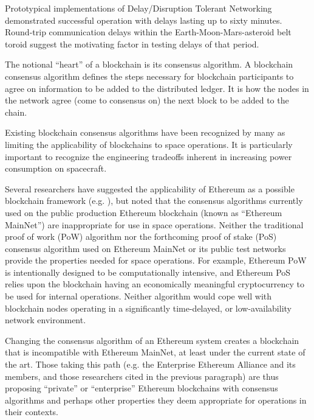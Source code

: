 \documentclass[journal ]{new-aiaa}
\begin{document}
Prototypical implementations of Delay/Disruption Tolerant Networking demonstrated successful operation with delays lasting up to sixty minutes. Round-trip communication delays within the Earth-Moon-Mars-asteroid belt toroid suggest the motivating factor in testing delays of that period.

The notional ``heart'' of a blockchain is its consensus algorithm. A blockchain consensus algorithm defines the steps necessary for blockchain participants to agree on information to be added to the distributed ledger. It is how the nodes in the network agree (come to consensus on) the next block to be added to the chain\cite{hyland-wood_future_2018}.

Existing blockchain consensus algorithms have been recognized by many as limiting the applicability of blockchains to space operations\cite{yu_blockchain_2019,yu_situational_2019,mandl_bitcoin_2017,molesky_blockchain_2018,xu_exploration_2019}. It is particularly important to recognize the engineering tradeoffs inherent in increasing power consumption on spacecraft\cite{lyke_energy_2017}.

Several researchers have suggested the applicability of Ethereum as a possible blockchain framework (e.g. \cite{israel_space_2019}), but noted that the consensus algorithms currently used on the public production Ethereum blockchain (known as ``Ethereum MainNet'') are inappropriate for use in space operations\cite{molesky_blockchain_2018,xu_exploration_2019,mital_blockchain_2019}. Neither the traditional proof of work (PoW) algorithm nor the forthcoming proof of stake (PoS) consensus algorithm used on Ethereum MainNet or its public test networks provide the properties needed for space operations. For example, Ethereum PoW is intentionally designed to be computationally intensive, and Ethereum PoS relies upon the blockchain having an economically meaningful cryptocurrency to be used for internal operations. Neither algorithm would cope well with blockchain nodes operating in a significantly time-delayed, or low-availability network environment.

Changing the consensus algorithm of an Ethereum system creates a blockchain that is incompatible with Ethereum MainNet, at least under the current state of the art. Those taking this path (e.g. the Enterprise Ethereum Alliance and its members, and those researchers cited in the previous paragraph) are thus proposing ``private'' or ``enterprise'' Ethereum blockchains with consensus algorithms and perhaps other properties they deem appropriate for operations in their contexts.
\end{document}
